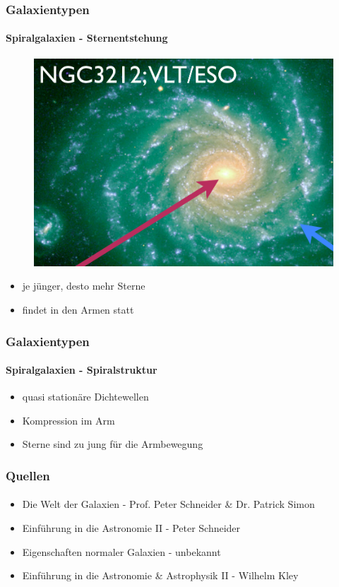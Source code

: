 \begin{frame}
\frametitle{Galaxientypen}
\framesubtitle{Spiralgalaxien - Sternentstehung}

\begin{figure}
\includegraphics[scale=0.25]{Sternentstehung_Spirale.png}
\end{figure}

\begin{itemize}
\item je jünger, desto mehr Sterne
\item findet in den Armen statt
\end{itemize}

\end{frame}


\begin{frame}
\frametitle{Galaxientypen}
\framesubtitle{Spiralgalaxien - Spiralstruktur}


\begin{itemize}
\item quasi stationäre Dichtewellen 
\item Kompression im Arm
\item Sterne sind zu jung für die Armbewegung
\end{itemize}

\end{frame}


\begin{frame}
\frametitle{Quellen}
\framesubtitle{ }


\begin{itemize}
\item Die Welt der Galaxien - Prof. Peter Schneider \& Dr. Patrick Simon
\item Einführung in die Astronomie II - Peter Schneider
\item Eigenschaften normaler Galaxien - unbekannt
\item Einführung in die Astronomie \& Astrophysik II - Wilhelm Kley
\end{itemize}

\end{frame}



